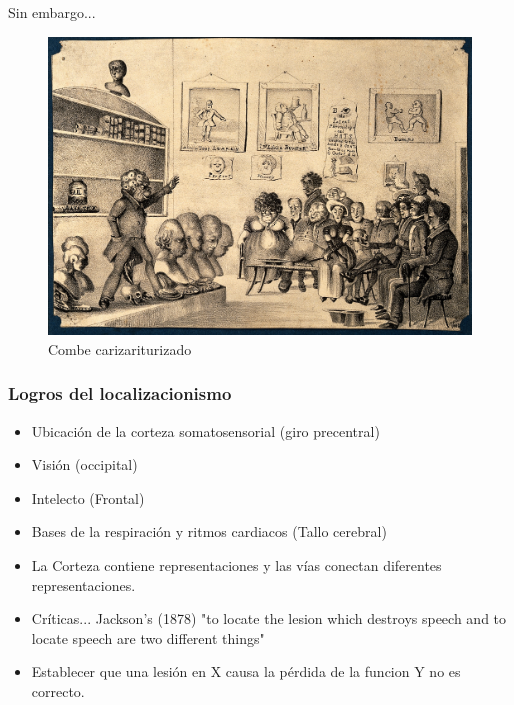 \documentclass{beamer}
\begin{document}
\begin{frame}{Sin embargo...}
    \transfade
    \begin{figure}
        \centering
        \includegraphics[width=0.9\linewidth]{caricaturafrenologia.jpg}
        \caption{Combe carizariturizado}
        \label{fig:my_label}
    \end{figure}
\end{frame}


		\begin{frame}
			\transfade
			\frametitle{Logros del localizacionismo}
			\begin{itemize}
				\item Ubicación de la corteza somatosensorial (giro precentral)
				\pause
				\item Visión (occipital)
				\pause
				\item Intelecto (Frontal)
				\pause
				\item Bases de la respiración y ritmos cardiacos (Tallo cerebral)
				\pause
				\item La Corteza contiene representaciones y las vías conectan diferentes representaciones.
				\pause
				\item Críticas... Jackson's (1878) "to locate the lesion which destroys speech and to locate speech are two different things"
				\pause
				\item Establecer que una lesión en X causa la pérdida de la funcion Y no es correcto.
				
			\end{itemize}
		\end{frame}
\end{document}
